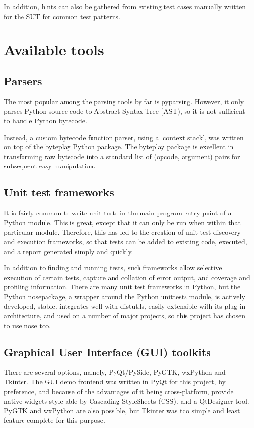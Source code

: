 \documentclass{icldt}
\numberwithin{equation}{section}       %
\begin{document}
{{In addition, hints can also be gathered from existing test cases manually written for the SUT for common test patterns.

\section{Available tools}
\subsection{Parsers}
The most popular among the parsing tools by far is \textsf{pyparsing}. However, it only parses Python source code to Abstract Syntax Tree (AST), so it is not sufficient to handle Python bytecode.

Instead, a custom bytecode function parser, using a `context stack', was written on top of the \textsf{byteplay} Python package. The \textsf{byteplay} package is excellent in transforming raw bytecode into a standard list of (opcode, argument) pairs for subsequent easy manipulation.

\subsection{Unit test frameworks}
It is fairly common to write unit tests in the main program entry point of a Python module. This is great, except that it can only be run when within that particular module. Therefore, this has led to the creation of unit test discovery and execution frameworks, so that tests can be added to existing code, executed, and a report generated simply and quickly.

In addition to finding and running tests, such frameworks allow selective execution of certain tests, capture and collation of error output, and coverage and profiling information. There are many unit test frameworks in Python, but the Python \textsf{nose}package, a wrapper around the Python \textsf{unittests} module, is actively developed, stable, integrates well with \textsf{distutils}, easily extensible with its plug-in architecture, and used on a number of major projects, so this project has chosen to use \textsf{nose} too.

\subsection{Graphical User Interface (GUI) toolkits}
There are several options, namely, \textsf{PyQt/PySide, PyGTK, wxPython and Tkinter}. The GUI demo frontend was written in PyQt for this project, by preference, and because of the advantages of it being cross-platform, provide native widgets style-able by Cascading StyleSheets (CSS), and a QtDesigner tool. PyGTK and wxPython are also possible, but Tkinter was too simple and least feature complete for this purpose.

}}
\end{document}
